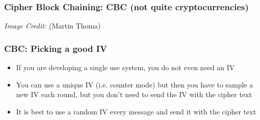 \documentclass{beamer}
\begin{document}
\begin{frame}
    \frametitle{Cipher Block Chaining: CBC (not quite cryptocurrencies)}
    \begin{figure}
        \begin{center}
        \end{center}
    \end{figure}
    \textit{Image Credit: }\href{https://github.com/MartinThoma/LaTeX-examples/blob/master/tikz/CBC-Mode-Encryption/CBC-Mode-Encryption.tex}(Martin Thoma)
\end{frame}

\begin{frame}
    \frametitle{CBC: Picking a good IV}
    \begin{itemize}
        \item \pause If you are developing a single use system, you do not even need an IV \pause
        \item You can use a unique IV (i.e. counter mode) but then you have to sample a new IV each round, but you don't need to send the IV with the cipher text \pause
        \item It is best to use a random IV every message and send it with the cipher text 
    \end{itemize}
\end{frame}
\end{document}
